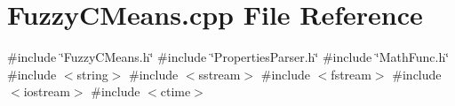 \section{Fuzzy\+C\+Means.\+cpp File Reference}
\label{_fuzzy_c_means_8cpp}
{\ttfamily \#include \char`\"{}Fuzzy\+C\+Means.\+h\char`\"{}}\newline
{\ttfamily \#include \char`\"{}Properties\+Parser.\+h\char`\"{}}\newline
{\ttfamily \#include \char`\"{}Math\+Func.\+h\char`\"{}}\newline
{\ttfamily \#include $<$string$>$}\newline
{\ttfamily \#include $<$sstream$>$}\newline
{\ttfamily \#include $<$fstream$>$}\newline
{\ttfamily \#include $<$iostream$>$}\newline
{\ttfamily \#include $<$ctime$>$}\newline
